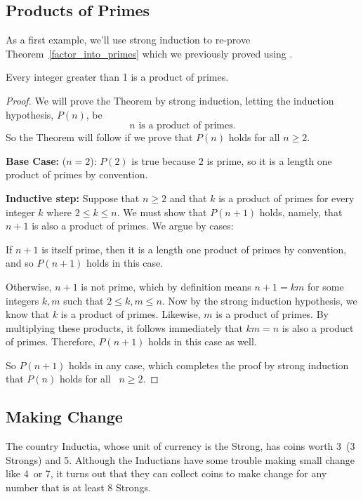 \subsection{Products of Primes}

As a first example, we'll use strong induction to re-prove
Theorem~\ref{factor_into_primes} which we previously proved using .

\begin{theorem*}%
Every integer greater than 1 is a product of primes.
\end{theorem*}

\begin{proof}

We will prove the Theorem by strong induction, letting the induction 
hypothesis, $P(n)$, be
\[
n \text{ is a product of primes}.
\]
So the Theorem will follow if we prove that $P(n)$ holds for all $n
\geq 2$.

\textbf{Base Case:} ($n=2$): $P(2)$ is true because $2$ is prime, so it is
a length one product of primes by convention.

\textbf{Inductive step:} Suppose that $n \geq 2$ and that $k$ is a product
of primes for every integer $k$ where $2 \leq k \le n$.  We must show that
$P(n+1)$ holds, namely, that $n+1$ is also a product of primes.  We argue
by cases:

If $n+1$ is itself prime, then it is a length one product of primes by
convention, and so $P(n+1)$ holds in this case.

Otherwise, $n + 1$ is not prime, which by definition means $n+1 = km$ for
some integers $k,m$ such that $2 \leq k,m \le n$.  Now by the strong
induction hypothesis, we know that $k$ is a product of primes.  Likewise,
$m$ is a product of primes.  By multiplying these products, it follows
immediately that $km = n$ is also a product of primes.  Therefore,
$P(n+1)$ holds in this case as well.

So $P(n+1)$ holds in any case, which completes the proof by strong
induction that $P(n)$ holds for all ~$n \ge 2$.

\end{proof}

\subsection{Making Change}

The country Inductia, whose unit of currency is the Strong, has coins
worth 3\sg\ (3 Strongs) and 5\sg.  Although the Inductians have some
trouble making small change like 4\sg\ or 7\sg, it turns out that they
can collect coins to make change for any number that is at least 8
Strongs.

